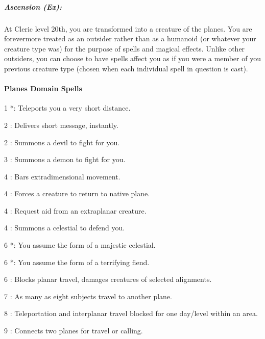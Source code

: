 % 
\subparagraph{Ascension (Ex):}
At Cleric level 20th, you are transformed into a creature of the planes.
You are forevermore treated as an outsider rather than as a humanoid (or whatever your creature type was) for the purpose of spells and magical effects.
Unlike other outsiders, you can choose to have spells affect you as if you were a member of you previous creature type (chosen when each individual spell in question is cast).
\paragraph{Planes Domain Spells}
\begin{list}{}{\leftmargin=1em}
\item[1] *: Teleports you a very short distance.
\item[2] : Delivers short message, instantly.
\item[2] : Summons a devil to fight for you.
\item[3] : Summons a demon to fight for you.
\item[4] : Bars extradimensional movement.
\item[4] : Forces a creature to return to native plane.
\item[4] : Request aid from an extraplanar creature.
\item[4] : Summons a celestial to defend you.
\item[6] *: You assume the form of a majestic celestial.
\item[6] *: You assume the form of a terrifying fiend.
\item[6] : Blocks planar travel, damages creatures of selected alignments.
\item[7] : As many as eight subjects travel to another plane.
\item[8] : Teleportation and interplanar travel blocked for one day/level within an area.
\item[9] : Connects two planes for travel or calling.
\end{list}
